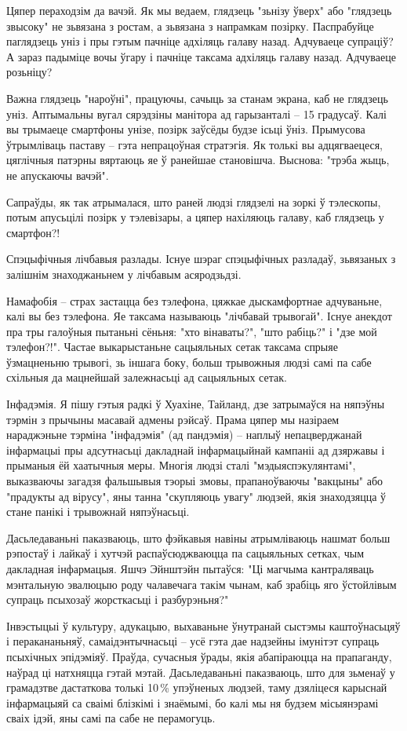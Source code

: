 Цяпер пераходзім да вачэй. Як мы ведаем, глядзець "зьнізу ўверх" або "глядзець звысоку" не зьвязана з ростам, а зьвязана з напрамкам позірку. Паспрабуйце паглядзець уніз і пры гэтым пачніце адхіляць галаву назад. Адчуваеце супраціў? А зараз падыміце вочы ўгару і пачніце таксама адхіляць галаву назад. Адчуваеце розьніцу?

Важна глядзець "нароўні", працуючы, сачыць за станам экрана, каб не глядзець уніз. Аптымальны вугал сярэдзіны манітора ад гарызанталі – 15 градусаў. Калі вы трымаеце смартфоны унізе, позірк заўсёды будзе ісьці ўніз. Прымусова ўтрымліваць паставу – гэта непрацоўная стратэгія. Як толькі вы адцягваецеся, цяглічныя патэрны вяртаюць яе ў ранейшае становішча. Выснова: "трэба жыць, не апускаючы вачэй".

Сапраўды, як так атрымалася, што раней людзі глядзелі на зоркі ў тэлескопы, потым апусьцілі позірк у тэлевізары, а цяпер нахіляюць галаву, каб глядзець у смартфон?!

Спэцыфічныя лічбавыя разлады. Існуе шэраг спэцыфічных разладаў, зьвязаных з залішнім знаходжаньнем у лічбавым асяродзьдзі.

Намафобія – страх застацца без тэлефона, цяжкае дыскамфортнае адчуваньне, калі вы без тэлефона. Яе таксама называюць "лічбавай трывогай". Існуе анекдот пра тры галоўныя пытаньні сёньня: "хто вінаваты?", "што рабіць?" і "дзе мой тэлефон?!". Частае выкарыстаньне сацыяльных сетак таксама спрыяе ўзмацненьню трывогі, зь іншага боку, больш трывожныя людзі самі па сабе схільныя да мацнейшай залежнасьці ад сацыяльных сетак.

Інфадэмія. Я пішу гэтыя радкі ў Хуахіне, Тайланд, дзе затрымаўся на няпэўны тэрмін з прычыны масавай адмены рэйсаў. Прама цяпер мы назіраем нараджэньне тэрміна "інфадэмія" (ад пандэмія) – наплыў непацверджанай інфармацыі пры адсутнасьці дакладнай інфармацыйнай кампаніі ад дзяржавы і прыманыя ёй хаатычныя меры. Многія людзі сталі "мэдыяспэкулянтамі", выказваючы загадзя фальшывыя тэорыі змовы, прапаноўваючы "вакцыны" або "прадукты ад вірусу", яны танна "скупляюць увагу" людзей, якія знаходзяцца ў стане панікі і трывожнай няпэўнасьці.

Дасьледаваньні паказваюць, што фэйкавыя навіны атрымліваюць нашмат больш рэпостаў і лайкаў і хутчэй распаўсюджваюцца па сацыяльных сетках, чым дакладная інфармацыя. Яшчэ Эйнштэйн пытаўся: "Ці магчыма кантраляваць мэнтальную эвалюцыю роду чалавечага такім чынам, каб зрабіць яго ўстойлівым супраць псыхозаў жорсткасьці і разбурэньня?" 

Інвэстыцыі ў культуру, адукацыю, выхаваньне ўнутранай сыстэмы каштоўнасьцяў і перакананьняў, самаідэнтычнасьці – усё гэта дае надзейны імунітэт супраць псыхічных эпідэміяў. Праўда, сучасныя ўрады, якія абапіраюцца на прапаганду, наўрад ці натхняцца гэтай мэтай. Дасьледаваньні паказваюць, што для зьменаў у грамадзтве дастаткова толькі 10\,\% упэўненых людзей, таму дзяліцеся карыснай інфармацыяй са сваімі блізкімі і знаёмымі, бо калі мы ня будзем місыянэрамі сваіх ідэй, яны самі па сабе не перамогуць.

